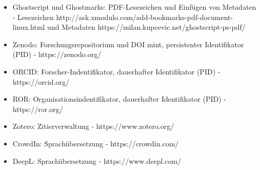 \documentclass{article}
\begin{document}
\begin{itemize}
\item Ghostscript und Ghostmarks: PDF-Lesezeichen und Einfügen von Metadaten - Lesezeichen http://ask.xmodulo.com/add-bookmarks-pdf-document-linux.html und Metadaten https://milan.kupcevic.net/ghostscript-ps-pdf/


\item Zenodo: Forschungsrepositorium und DOI mint, persistenter Identifikator (PID) - https://zenodo.org/


\item ORCID: Forscher-Indentifikator, dauerhafter Identifikator (PID) - https://orcid.org/


\item ROR: Organisationsindentifikator, dauerhafter Identifikator (PID) - https://ror.org/


\item Zotero: Zitierverwaltung - https://www.zotero.org/


\item CrowdIn: Sprachübersetzung - https://crowdin.com/


\item DeepL: Sprachübersetzung - https://www.deepl.com/


\end{itemize}
\end{document}
